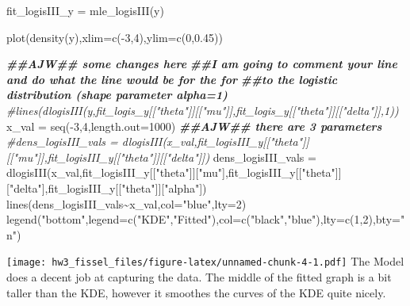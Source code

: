 \documentclass[
]{article}
\newenvironment{Shaded}{\begin{snugshade}}{\end{snugshade}}
\newcommand{\AttributeTok}[1]{\textcolor[rgb]{0.77,0.63,0.00}{#1}}
\newcommand{\CommentTok}[1]{\textcolor[rgb]{0.56,0.35,0.01}{\textit{#1}}}
\newcommand{\DecValTok}[1]{\textcolor[rgb]{0.00,0.00,0.81}{#1}}
\newcommand{\DocumentationTok}[1]{\textcolor[rgb]{0.56,0.35,0.01}{\textbf{\textit{#1}}}}
\newcommand{\FloatTok}[1]{\textcolor[rgb]{0.00,0.00,0.81}{#1}}
\newcommand{\FunctionTok}[1]{\textcolor[rgb]{0.00,0.00,0.00}{#1}}
\newcommand{\NormalTok}[1]{#1}
\newcommand{\OtherTok}[1]{\textcolor[rgb]{0.56,0.35,0.01}{#1}}
\newcommand{\SpecialCharTok}[1]{\textcolor[rgb]{0.00,0.00,0.00}{#1}}
\newcommand{\StringTok}[1]{\textcolor[rgb]{0.31,0.60,0.02}{#1}}
\begin{document}
\begin{Shaded}
\begin{Highlighting}[]
\NormalTok{fit\_logisIII\_y }\OtherTok{=} \FunctionTok{mle\_logisIII}\NormalTok{(y)}

\FunctionTok{plot}\NormalTok{(}\FunctionTok{density}\NormalTok{(y),}\AttributeTok{xlim=}\FunctionTok{c}\NormalTok{(}\SpecialCharTok{{-}}\DecValTok{3}\NormalTok{,}\DecValTok{4}\NormalTok{),}\AttributeTok{ylim=}\FunctionTok{c}\NormalTok{(}\DecValTok{0}\NormalTok{,}\FloatTok{0.45}\NormalTok{))}

\DocumentationTok{\#\#AJW\#\# some changes here}
\DocumentationTok{\#\#I am going to comment your line and do what the line would be for the for}
\DocumentationTok{\#\#to the logistic distribution (shape parameter alpha=1)}
\CommentTok{\#lines(dlogisIII(y,fit\_logis\_y[["theta"]][["mu"]],fit\_logis\_y[["theta"]][["delta"]],1))}
\NormalTok{x\_val }\OtherTok{=} \FunctionTok{seq}\NormalTok{(}\SpecialCharTok{{-}}\DecValTok{3}\NormalTok{,}\DecValTok{4}\NormalTok{,}\AttributeTok{length.out=}\DecValTok{1000}\NormalTok{)}
\DocumentationTok{\#\#AJW\#\# there are 3 parameters}
\CommentTok{\#dens\_logisIII\_vals = dlogisIII(x\_val,fit\_logisIII\_y[["theta"]][["mu"]],fit\_logisIII\_y[["theta"]][["delta"]])}
\NormalTok{dens\_logisIII\_vals }\OtherTok{=} \FunctionTok{dlogisIII}\NormalTok{(x\_val,fit\_logisIII\_y[[}\StringTok{"theta"}\NormalTok{]][}\StringTok{"mu"}\NormalTok{],fit\_logisIII\_y[[}\StringTok{"theta"}\NormalTok{]][}\StringTok{"delta"}\NormalTok{],fit\_logisIII\_y[[}\StringTok{"theta"}\NormalTok{]][}\StringTok{"alpha"}\NormalTok{])}
\FunctionTok{lines}\NormalTok{(dens\_logisIII\_vals}\SpecialCharTok{\textasciitilde{}}\NormalTok{x\_val,}\AttributeTok{col=}\StringTok{"blue"}\NormalTok{,}\AttributeTok{lty=}\DecValTok{2}\NormalTok{)}
\FunctionTok{legend}\NormalTok{(}\StringTok{"bottom"}\NormalTok{,}\AttributeTok{legend=}\FunctionTok{c}\NormalTok{(}\StringTok{"KDE"}\NormalTok{,}\StringTok{"Fitted"}\NormalTok{),}\AttributeTok{col=}\FunctionTok{c}\NormalTok{(}\StringTok{"black"}\NormalTok{,}\StringTok{"blue"}\NormalTok{),}\AttributeTok{lty=}\FunctionTok{c}\NormalTok{(}\DecValTok{1}\NormalTok{,}\DecValTok{2}\NormalTok{),}\AttributeTok{bty=}\StringTok{"n"}\NormalTok{)}
\end{Highlighting}
\end{Shaded}

\texttt{[image: hw3\_fissel\_files/figure-latex/unnamed-chunk-4-1.pdf]}
The Model does a decent job at capturing the data. The middle of the
fitted graph is a bit taller than the KDE, however it smoothes the
curves of the KDE quite nicely.
\end{document}
